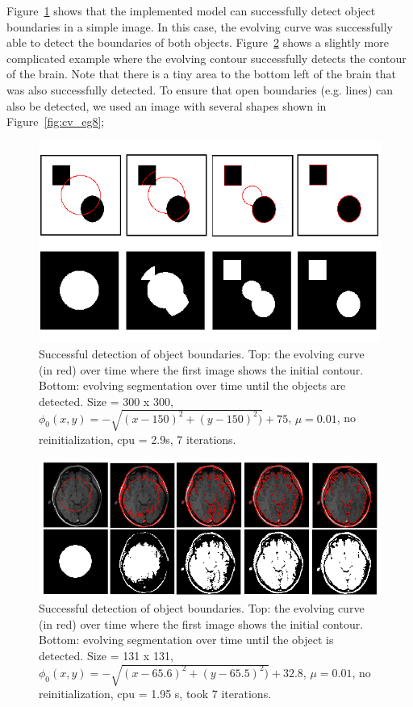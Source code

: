 \documentclass[10pt,twocolumn,letterpaper]{article}
\begin{document}
Figure~\ref{fig:cv_eg1} shows that the implemented model can successfully detect object boundaries in a simple image. In this case, the evolving curve was
successfully able to detect the boundaries of both objects. Figure~\ref{fig:cv_eg2} shows a slightly more complicated example where the evolving contour
successfully detects the contour of the brain. Note that there is a tiny area to the bottom left of the brain that was also successfully detected. To ensure
that open boundaries (e.g. lines) can also be detected, we used an image with several shapes shown in Figure~\ref{fig:cv_eg8};


\begin{figure}[t]
\centering
\includegraphics[width=12cm]{cv_eg1.png}
\caption{Successful detection of object boundaries. Top: the evolving curve (in red) over time where the first image shows the initial contour.
Bottom: evolving segmentation over time until the objects are detected. Size = 300 x 300, $\phi_{0}(x,y) = - \sqrt{(x - 150)^2 + (y - 150)^2)} + 75$, $\mu =
0.01$, no reinitialization, cpu = 2.9s, 7 iterations.}
\label{fig:cv_eg1}
\end{figure}

\begin{figure}[t]
\centering
\includegraphics[width=12cm]{cv_eg2.png}
\caption{Successful detection of object boundaries. Top: the evolving curve (in red) over time where the first image shows the initial contour.
Bottom: evolving segmentation over time until the object is detected. Size = 131 x 131, $\phi_{0}(x,y) = - \sqrt{(x - 65.6)^2 + (y - 65.5)^2)} + 32.8$, $\mu =
0.01$, no reinitialization, cpu = 1.95 s, took 7 iterations.}
\label{fig:cv_eg2}
\end{figure}
\end{document}
